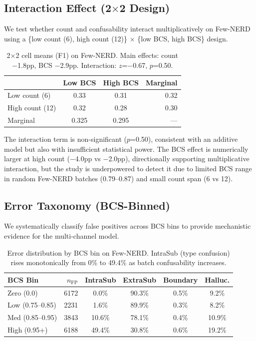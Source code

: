 \documentclass[11pt,a4paper]{article}
\begin{document}
\subsection{Interaction Effect (2$\times$2 Design)}
\label{sec:interaction}

We test whether count and confusability interact multiplicatively on Few-NERD using a \{low count (6), high count (12)\} $\times$ \{low BCS, high BCS\} design.

\begin{table}[h]
\centering
\small
\begin{tabular}{@{}lccr@{}}
\toprule
& \textbf{Low BCS} & \textbf{High BCS} & \textbf{Marginal} \\
\midrule
Low count (6) & 0.33 & 0.31 & 0.32 \\
High count (12) & 0.32 & 0.28 & 0.30 \\
\midrule
Marginal & 0.325 & 0.295 & --- \\
\bottomrule
\end{tabular}
\caption{2$\times$2 cell means (F1) on Few-NERD. Main effects: count $-$1.8pp, BCS $-$2.9pp. Interaction: $z$=$-$0.67, $p$=0.50.}
\label{tab:interaction}
\end{table}

The interaction term is non-significant ($p$=0.50), consistent with an additive model but also with insufficient statistical power. The BCS effect is numerically larger at high count ($-$4.0pp vs $-$2.0pp), directionally supporting multiplicative interaction, but the study is underpowered to detect it due to limited BCS range in random Few-NERD batches (0.79--0.87) and small count span (6 vs 12).

\subsection{Error Taxonomy (BCS-Binned)}
\label{sec:taxonomy}

We systematically classify false positives across BCS bins to provide mechanistic evidence for the multi-channel model.

\begin{table}[h]
\centering
\small
\begin{tabular}{@{}lrcccc@{}}
\toprule
\textbf{BCS Bin} & \textbf{$n_{\text{FP}}$} & \textbf{IntraSub} & \textbf{ExtraSub} & \textbf{Boundary} & \textbf{Halluc.} \\
\midrule
Zero (0.0) & 6172 & 0.0\% & 90.3\% & 0.5\% & 9.2\% \\
Low (0.75--0.85) & 2231 & 1.6\% & 89.9\% & 0.3\% & 8.2\% \\
Med (0.85--0.95) & 3843 & 10.6\% & 78.1\% & 0.4\% & 10.9\% \\
High (0.95+) & 6188 & 49.4\% & 30.8\% & 0.6\% & 19.2\% \\
\bottomrule
\end{tabular}
\caption{Error distribution by BCS bin on Few-NERD. IntraSub (type confusion) rises monotonically from 0\% to 49.4\% as batch confusability increases.}
\label{tab:error_taxonomy}
\end{table}
\end{document}
